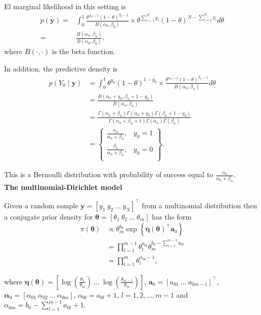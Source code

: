 \begin{enumerate}
El marginal likelihood in this setting is
\begin{align}
	p(\bm{y})=&\int_{0}^1 \frac{\theta^{\alpha_0-1}(1-\theta)^{\beta_0-1}}{B(\alpha_0,\beta_0)}\times \theta^{\sum_{i=1}^N y_i}(1-\theta)^{N-\sum_{i=1}^N y_i}d\theta\nonumber\\
	=& \frac{B(\alpha_n,\beta_n)}{B(\alpha_0,\beta_0)},\nonumber
\end{align}
where $B(\cdot ,\cdot)$ is the beta function.

In addition, the predictive density is
\begin{align}
	p(Y_0\mid \bm{y})&=\int_0^1 \theta^{y_0}(1-\theta)^{1-y_0}\times \frac{\theta^{\alpha_n-1}(1-\theta)^{\beta_n-1}}{B(\alpha_n,\beta_n)}d\theta\nonumber\\
	&=\frac{B(\alpha_n+y_0,\beta_n+1-y_0)}{B(\alpha_n,\beta_n)}\nonumber\\
	&=\frac{\Gamma(\alpha_n+\beta_n)\Gamma(\alpha_n+y_0)\Gamma(\beta_n+1-y_0)}{\Gamma(\alpha_n+\beta_n+1)\Gamma(\alpha_n)\Gamma(\beta_n)}\nonumber\\
	&=\begin{Bmatrix}
		\frac{\alpha_n}{\alpha_n+\beta_n}, & y_0=1\\
		\frac{\beta_n}{\alpha_n+\beta_n}, & y_0=0\\
	\end{Bmatrix}.\nonumber
\end{align}

This is a Bernoulli distribution with probability of success equal to $\frac{\alpha_n}{\alpha_n+\beta_n}$.\\ 

\textbf{The multinomial-Dirichlet model}

Given a random sample $\bm{y}=[y_1 \ y_2 \ \dots \ y_N]^{\top}$ from a multinomial distribution then a conjugate prior density for $\bm{\theta}=\left[\theta_1 \ \theta_2 \ \dots \ \theta_m\right]$ has the form 
\begin{align}
	\pi(\bm{\theta})&\propto \theta_m^{b_0} \exp\left\{\bm{\eta}(\bm{\theta})^{\top}\bm{a}_0\right\}\nonumber\\
	& = \prod_{l=1}^{m-1}\theta_l^{a_{0l}}\theta_m^{b_0-\sum_{l=1}^{m-1}a_{0l}}\nonumber\\
	& = \prod_{l=1}^{m}\theta_l^{\alpha_{0l}-1},\nonumber
\end{align}

where $\bm{\eta}(\bm{\theta})=\left[\log\left(\frac{\theta_1}{\theta_m}\right) \ \dots \ \log\left(\frac{\theta_{m-1}}{\theta_m}\right)\right]$, $\bm{a}_0=\left[a_{01} \ \dots \ a_{0m-1}\right]^{\top}$, $\bm{\alpha}_0=\left[\alpha_{01} \ \alpha_{02} \ \dots \ \alpha_{0m}\right]$, $\alpha_{0l}=a_{0l}+1$, $l=1,2,\dots,m-1$ and $\alpha_{0m}=b_0-\sum_{l=1}^{m-1} a_{0l}+1$. 


\end{enumerate}
